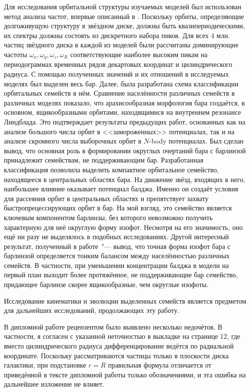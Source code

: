 \documentclass{trnotes}
\begin{document}
Для исследования орбитальной структуры изучаемых моделей был использован метод анализа частот, впервые описанный в \citet{binney1982}.
Поскольку орбиты, определяющие долгоживущую структуру в звёздном диске, должны быть квазипериодическими, их спектры должны состоять из
дискретного набора пиков. Для всех 4 млн. частиц звёздного диска в каждой из моделей были рассчитаны доминирующие частоты
$ω_x, ω_y, ω_z, ω_R$ соответствующие наиболее высоким пикам на периодограммах временных рядов декартовых координат и цилиндрического радиуса. 
С помощью полученных значений и их отношений в исследуемых моделях был выделен весь бар. 
Далее, была разработана схема классификации орбитальных семейств в нём.
Сравнение населённости различных семейств в различных моделях показало, что арахисообразная морфология бара создаётся, в 
основном, ящикообразными орбитами, находящимися на внутреннем резонансе Линдблада. Это подтверждает результаты предыдущих работ, основанных как на анализе большого числа орбит в <<замороженных>> потенциалах, так и на анализе скромного числа выборочных орбит в $N$-body потенциалах. 
Был сделан вывод, что основная роль в формировании округлых очертаний бара с барлинзой принадлежит семействам, не поддерживающим бар. 
Разработанная классификация позволила выделить компактное орбитальное семейство, находящееся в центральных областях бара. 
На движение звёзд, входящих в него, наибольшее влияние оказывает потенциал балджа. 
Именно он создаёт условия для рассеяния орбит в центральных областях и препятствует захвату быстропрецессирующих орбит в бар.
На мой взгляд, это семейство является ключевым компонентом барлинзы, без которого невозможно получить характерную для неё округлую форму изофот.
Несмотря на его значимость, оно ещё ни разу не выделялось в подобных исследованиях.
Другой интересный результат, полученный в работе~"--- вывод, что точная форма изофот бара с барлинзой определяется тонким балансом между
населённостью различных семейств. В частности, при уменьшении концентрации балджа в модели на первый план выходит более протяжённое, 
не поддерживающие бар семейство, придающее барлинзе скорее ящикообразные, чем округлые изофоты. 

Исследование кинематики и эволюции выделенных семейств является предметом для дальнейших исследований, продолжающих эту работу.



\newpage
В дипломной работе рецензентом было выявлено несколько недочётов.
В частности, я согласен с указанной неточностью в выкладке на странице 12, где вместо цилиндрического радиуса 
дифференцирование ведётся по радиальной координате. Поскольку рассматриваются частицы только в плоскости диска
галактики, при подстановке $r=R$ правильная формула отличается от приведённой в тексте дипломной работы только
обозначениями, и эта ошибка на дальнейшее изложение не влияет.
\end{document}
